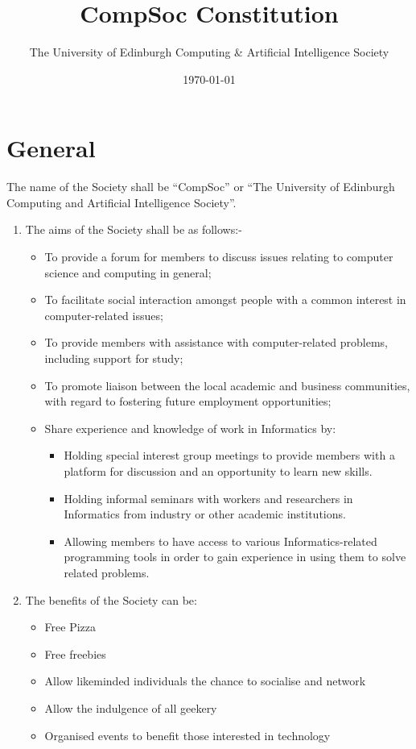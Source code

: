 \documentclass{article}
\begin{document}
\title{CompSoc Constitution}
\author{The University of Edinburgh Computing \& Artificial Intelligence Society}
\date{\today{}}
\maketitle

\section{General}

The name of the Society shall be ``CompSoc'' or ``The University of
Edinburgh Computing and Artificial Intelligence Society''.

\begin{enumerate}
  \item The aims of the Society shall be as follows:-
    \begin{itemize}
      \item To provide a forum for members to discuss issues relating to computer science and computing in general;
      \item To facilitate social interaction amongst people with a common interest in computer-related issues;
      \item To provide members with assistance with computer-related problems, including support for study;
      \item To promote liaison between the local academic and business communities, with regard to fostering future employment opportunities;
      \item Share experience and knowledge of work in Informatics by:
        \begin{itemize}
          \item Holding special interest group meetings to provide members with a platform for discussion and an opportunity to learn new skills.
          \item Holding informal seminars with workers and researchers in Informatics from industry or other academic institutions.
          \item Allowing members to have access to various Informatics-related programming tools in order to gain experience in using them to solve related problems.
        \end{itemize}
    \end{itemize}


  \item The benefits of the Society can be:
    \begin{itemize}
      \item Free Pizza
      \item Free freebies
      \item Allow likeminded individuals the chance to socialise and network
      \item Allow the indulgence of all geekery
      \item Organised events to benefit those interested in technology
    \end{itemize}
    


\end{enumerate}
\end{document}
